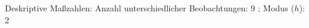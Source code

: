 				\label{tableValues:afvt01l_g1r}
				\vspace*{-\baselineskip}
                    \begin{noten}
                	    \note{} Deskriptive Maßzahlen:
                	    Anzahl unterschiedlicher Beobachtungen: 9%
                	    ; 
                	      Modus ($h$): 2
                     \end{noten}

